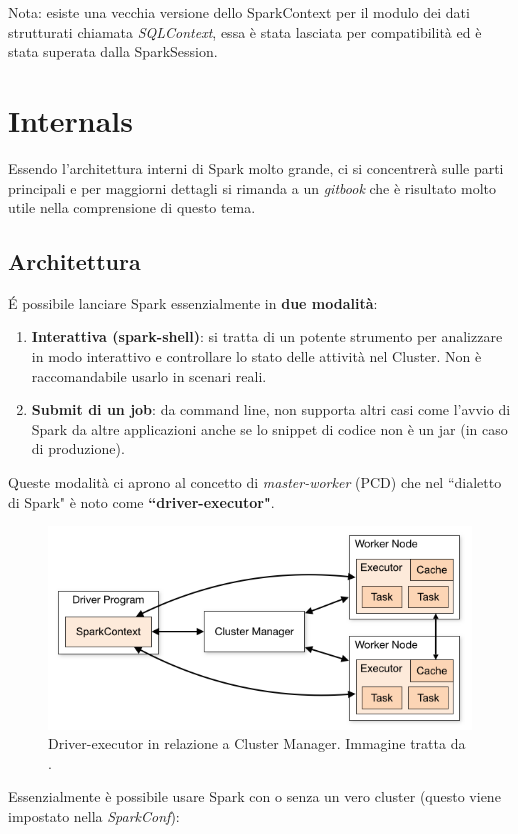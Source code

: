 \documentclass[12pt,italian]{article}
\begin{document}
Nota: esiste una vecchia versione dello SparkContext per il modulo dei dati strutturati chiamata \textit{SQLContext}, essa è stata lasciata per compatibilità ed è stata superata dalla SparkSession.
\section{Internals}
Essendo l'architettura interni di Spark molto grande, ci si concentrerà sulle parti principali e per maggiorni dettagli si rimanda a un \textit{gitbook} \cite{internals} che è risultato molto utile nella comprensione di questo tema.
\subsection{Architettura}
É possibile lanciare Spark essenzialmente in \textbf{due modalità}:
\begin{enumerate}
	\item \textbf{Interattiva (spark-shell)}: si tratta di un potente strumento per analizzare in modo interattivo e controllare lo stato delle attività nel Cluster. Non è raccomandabile usarlo in scenari reali.
	\item \textbf{Submit di un job}: da command line, non supporta altri casi come l'avvio di Spark da altre applicazioni anche se lo snippet di codice non è un jar (in caso di produzione).
\end{enumerate}
Queste modalità ci aprono al concetto di \textit{master-worker} (PCD) che nel ``dialetto di Spark" è noto come \textbf{``driver-executor"}.
\begin{figure}[H]
	\centering 
	\includegraphics[width=1\linewidth]{img/cluster-overview.png}
	\caption{Driver-executor in relazione a Cluster Manager. Immagine tratta da \cite{spark}.}
	\label{fig:driverexecutor}
\end{figure}
Essenzialmente è possibile usare Spark con o senza un vero cluster (questo viene impostato nella \textit{SparkConf}):
\end{document}
